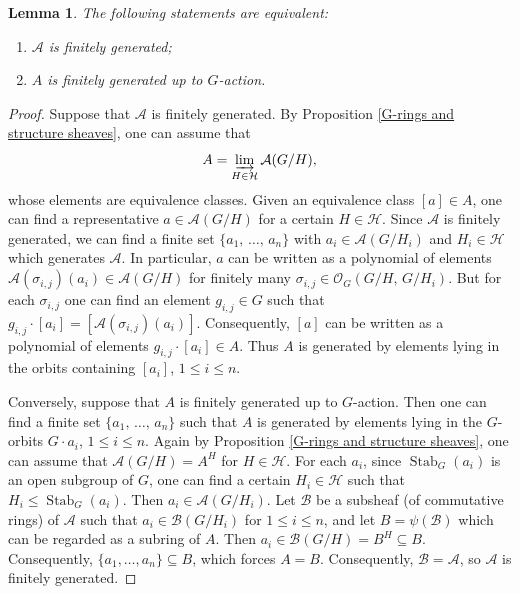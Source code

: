 \documentclass[11pt, reqno]{amsart}
\theoremstyle{plain}
\newtheorem{lemma}[theorem]{Lemma}
\numberwithin{equation}{section}
\theoremstyle{definition}
\DeclareMathOperator{\Stab}{Stab}
\begin{document}
\begin{lemma} \label{finite generation of rings}
The following statements are equivalent:
\begin{enumerate}
\item $\mathcal{A}$ is finitely generated;

\item $A$ is finitely generated up to $G$-action.
\end{enumerate}
\end{lemma}

\begin{proof}
Suppose that $\mathcal{A}$ is finitely generated. By Proposition \ref{G-rings and structure sheaves}, one can assume that
\[
A = \varinjlim_{H \in \mathcal{H}} \mathcal{A}(G/H),
\]
whose elements are equivalence classes. Given an equivalence class $[a] \in A$, one can find a representative $a \in \mathcal{A}(G/H)$ for a certain $H \in \mathcal{H}$. Since $\mathcal{A}$ is finitely generated, we can find a finite set $\{a_1, \, \ldots, \, a_n\}$ with $a_i \in \mathcal{A}(G/H_i)$ and $H_i \in \mathcal{H}$ which generates $\mathcal{A}$. In particular, $a$ can be written as a polynomial of elements $\mathcal{A} (\sigma_{i,j}) (a_i) \in \mathcal{A}(G/H)$ for finitely many $\sigma_{i, j} \in \mathcal{O}_G(G/H, \, G/H_i)$. But for each $\sigma_{i, j}$ one can find an element $g_{i, j} \in G$ such that $g_{i, j} \cdot [a_i] = [\mathcal{A} (\sigma_{i, j}) (a_i)]$. Consequently, $[a]$ can be written as a polynomial of elements $g_{i, j} \cdot [a_i] \in A$. Thus $A$ is generated by elements lying in the orbits containing $[a_i]$, $1 \leqslant i \leqslant n$.

Conversely, suppose that $A$ is finitely generated up to $G$-action. Then one can find a finite set $\{a_1, \, \ldots, \, a_n\}$ such that $A$ is generated by elements lying in the $G$-orbits $G\cdot a_i$, $1 \leqslant i \leqslant n$. Again by Proposition \ref{G-rings and structure sheaves}, one can assume that $\mathcal{A}(G/H) = A^H$ for $H \in \mathcal{H}$. For each $a_i$, since $\Stab_G(a_i)$ is an open subgroup of $G$, one can find a certain $H_i \in \mathcal{H}$ such that $H_i \leqslant \Stab_G(a_i)$. Then $a_i \in \mathcal{A}(G/H_i)$. Let $\mathcal{B}$ be a subsheaf (of commutative rings) of $\mathcal{A}$ such that $a_i \in \mathcal{B}(G/H_i)$ for $1 \leqslant i \leqslant n$, and let $B = \psi(\mathcal{B})$ which can be regarded as a subring of $A$. Then $a_i \in \mathcal{B} (G/H) = B^H \subseteq B$. Consequently, $\{a_1, \ldots, a_n \} \subseteq B$, which forces $A = B$. Consequently, $\mathcal{B} = \mathcal{A}$, so $\mathcal{A}$ is finitely generated.
\end{proof}
\end{document}
